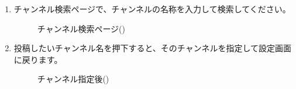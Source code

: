 \begin{enumerate}
    \newpage
    \item チャンネル検索ページで、チャンネルの名称を入力して検索してください。
        \begin{figure}[htbp]
            \centering
            \caption{チャンネル検索ページ(\currentVersion)}
            \label{img:guide5}
        \end{figure}

    \newpage
    \item 投稿したいチャンネル名を押下すると、そのチャンネルを指定して設定画面に戻ります。
        \begin{figure}[htbp]
            \centering
            \caption{チャンネル指定後(\currentVersion)}
            \label{img:guide6}
        \end{figure}
\end{enumerate}